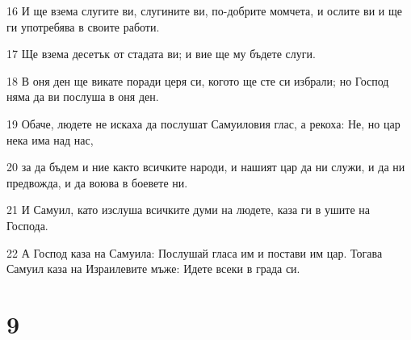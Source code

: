 \par 16 И ще взема слугите ви, слугините ви, по-добрите момчета, и ослите ви и ще ги употребява в своите работи.
\par 17 Ще взема десетък от стадата ви; и вие ще му бъдете слуги.
\par 18 В оня ден ще викате поради церя си, когото ще сте си избрали; но Господ няма да ви послуша в оня ден.
\par 19 Обаче, людете не искаха да послушат Самуиловия глас, а рекоха: Не, но цар нека има над нас,
\par 20 за да бъдем и ние както всичките народи, и нашият цар да ни служи, и да ни предвожда, и да воюва в боевете ни.
\par 21 И Самуил, като изслуша всичките думи на людете, каза ги в ушите на Господа.
\par 22 А Господ каза на Самуила: Послушай гласа им и постави им цар. Тогава Самуил каза на Израилевите мъже: Идете всеки в града си.

\chapter{9}

